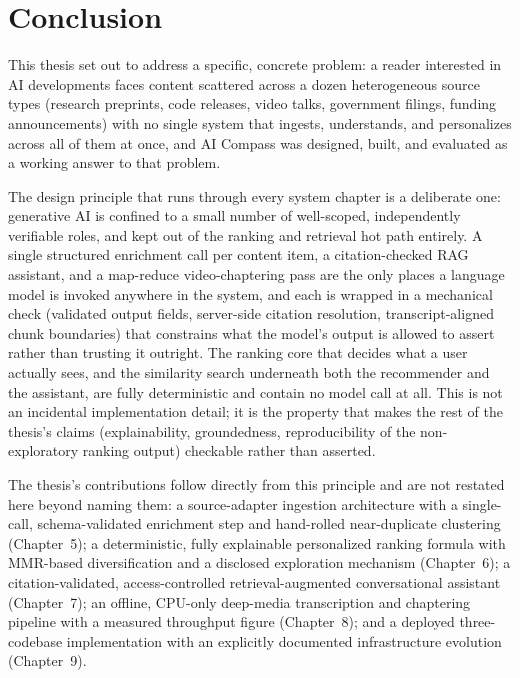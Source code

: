 \chapter{Conclusion}
\label{ch:conclusion}

This thesis set out to address a specific, concrete problem: a reader interested in AI developments faces content scattered across a dozen heterogeneous source types (research preprints, code releases, video talks, government filings, funding announcements) with no single system that ingests, understands, and personalizes across all of them at once, and AI Compass was designed, built, and evaluated as a working answer to that problem.

The design principle that runs through every system chapter is a deliberate one: generative AI is confined to a small number of well-scoped, independently verifiable roles, and kept out of the ranking and retrieval hot path entirely. A single structured enrichment call per content item, a citation-checked RAG assistant, and a map-reduce video-chaptering pass are the only places a language model is invoked anywhere in the system, and each is wrapped in a mechanical check (validated output fields, server-side citation resolution, transcript-aligned chunk boundaries) that constrains what the model's output is allowed to assert rather than trusting it outright. The ranking core that decides what a user actually sees, and the similarity search underneath both the recommender and the assistant, are fully deterministic and contain no model call at all. This is not an incidental implementation detail; it is the property that makes the rest of the thesis's claims (explainability, groundedness, reproducibility of the non-exploratory ranking output) checkable rather than asserted.

The thesis's contributions follow directly from this principle and are not restated here beyond naming them: a source-adapter ingestion architecture with a single-call, schema-validated enrichment step and hand-rolled near-duplicate clustering (Chapter~5); a deterministic, fully explainable personalized ranking formula with MMR-based diversification and a disclosed exploration mechanism (Chapter~6); a citation-validated, access-controlled retrieval-augmented conversational assistant (Chapter~7); an offline, CPU-only deep-media transcription and chaptering pipeline with a measured throughput figure (Chapter~8); and a deployed three-codebase implementation with an explicitly documented infrastructure evolution (Chapter~9).

